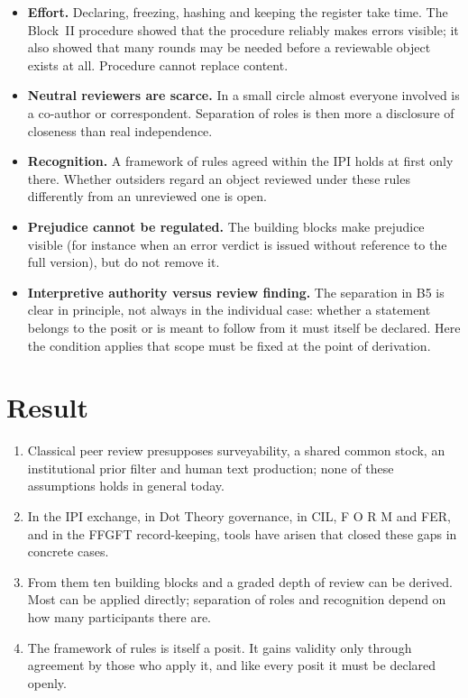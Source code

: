 \begin{itemize}
\item \textbf{Effort.} Declaring, freezing, hashing and keeping the register take time. The
  Block~II procedure showed that the procedure reliably makes errors visible; it also
  showed that many rounds may be needed before a reviewable object exists at all.
  Procedure cannot replace content.
\item \textbf{Neutral reviewers are scarce.} In a small circle almost everyone involved is a
  co-author or correspondent. Separation of roles is then more a disclosure of closeness
  than real independence.
\item \textbf{Recognition.} A framework of rules agreed within the IPI holds at first only
  there. Whether outsiders regard an object reviewed under these rules differently from an
  unreviewed one is open.
\item \textbf{Prejudice cannot be regulated.} The building blocks make prejudice visible (for
  instance when an error verdict is issued without reference to the full version), but do
  not remove it.
\item \textbf{Interpretive authority versus review finding.} The separation in B5 is clear in
  principle, not always in the individual case: whether a statement belongs to the posit or
  is meant to follow from it must itself be declared. Here the condition applies that scope
  must be fixed at the point of derivation.
\end{itemize}

\section{Result}

\begin{enumerate}
\item Classical peer review presupposes surveyability, a shared common stock, an
  institutional prior filter and human text production; none of these assumptions holds in
  general today.
\item In the IPI exchange, in Dot Theory governance, in CIL, F O R M and FER, and in the
  FFGFT record-keeping, tools have arisen that closed these gaps in concrete cases.
\item From them ten building blocks and a graded depth of review can be derived. Most can be
  applied directly; separation of roles and recognition depend on how many participants
  there are.
\item The framework of rules is itself a posit. It gains validity only through agreement by
  those who apply it, and like every posit it must be declared openly.
\end{enumerate}

